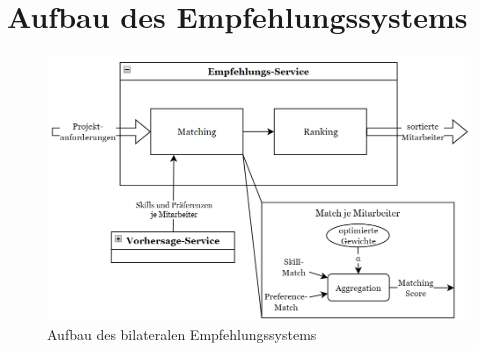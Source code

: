 \section{Aufbau des Empfehlungssystems}

\begin{figure}[H]
    \centering
	\includegraphics[width=1.0\textwidth]{gfx/empfehlungsservice.png}
	\caption[Aufbau des bilateralen Empfehlungssystems]{Aufbau des bilateralen Empfehlungssystems}
	\label{fig:algorithmus:abb1}
\end{figure}


